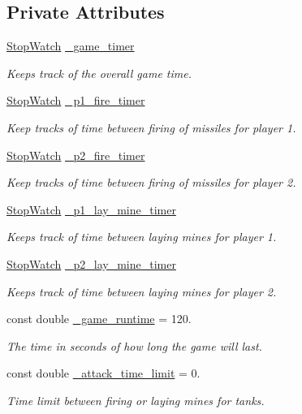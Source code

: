\subsection*{Private Attributes}
\begin{DoxyCompactItemize}
\item 
\hyperlink{classStopWatch}{Stop\-Watch} \hyperlink{classGameStateManager_a059c0be895a3ed3632257fbeb65b86d9}{\-\_\-game\-\_\-timer}
\begin{DoxyCompactList}\small\item\em Keeps track of the overall game time. \end{DoxyCompactList}\item 
\hyperlink{classStopWatch}{Stop\-Watch} \hyperlink{classGameStateManager_a56b5da52f57018c53a29ee4adef4acff}{\-\_\-p1\-\_\-fire\-\_\-timer}
\begin{DoxyCompactList}\small\item\em Keep tracks of time between firing of missiles for player 1. \end{DoxyCompactList}\item 
\hyperlink{classStopWatch}{Stop\-Watch} \hyperlink{classGameStateManager_a6ffa94597eef770ae4c812a834daa39c}{\-\_\-p2\-\_\-fire\-\_\-timer}
\begin{DoxyCompactList}\small\item\em Keep tracks of time between firing of missiles for player 2. \end{DoxyCompactList}\item 
\hyperlink{classStopWatch}{Stop\-Watch} \hyperlink{classGameStateManager_a7e424def0f4a2f1548b5b63629cd66f1}{\-\_\-p1\-\_\-lay\-\_\-mine\-\_\-timer}
\begin{DoxyCompactList}\small\item\em Keeps track of time between laying mines for player 1. \end{DoxyCompactList}\item 
\hyperlink{classStopWatch}{Stop\-Watch} \hyperlink{classGameStateManager_a14203d39640e3368bc75c2e9b853a452}{\-\_\-p2\-\_\-lay\-\_\-mine\-\_\-timer}
\begin{DoxyCompactList}\small\item\em Keeps track of time between laying mines for player 2. \end{DoxyCompactList}\item 
const double \hyperlink{classGameStateManager_a225d7168ceade083143153748bd55264}{\-\_\-game\-\_\-runtime} = 120.
\begin{DoxyCompactList}\small\item\em The time in seconds of how long the game will last. \end{DoxyCompactList}\item 
const double \hyperlink{classGameStateManager_a94f553200fdb06e224376f60c0bcec4f}{\-\_\-attack\-\_\-time\-\_\-limit} = 0.
\begin{DoxyCompactList}\small\item\em Time limit between firing or laying mines for tanks. \end{DoxyCompactList}\end{DoxyCompactItemize}


